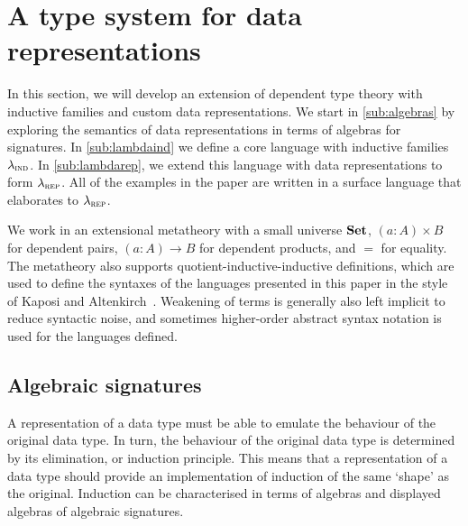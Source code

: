 \section{A type system for data representations}\label{sec:type-system}


In this section, we will develop an extension of dependent type theory with
inductive families and custom data representations. We start in
\cref{sub:algebras} by exploring the semantics of data representations in terms
of algebras for signatures. In \cref{sub:lambdaind}
we define a core language with inductive families $\lambda_{\textsc{ind}}$. In
\cref{sub:lambdarep}, we extend this language with data representations to form
$\lambda_{\textsc{rep}}$. All of the examples in the paper are written in a surface language
that elaborates to $\lambda_{\textsc{rep}}$.

We work in an extensional metatheory with a small universe $\mathbf{Set}$, $(a : A)
\times B$ for dependent pairs, $(a : A) \to B$ for dependent products, and $=$
for equality. The metatheory also supports quotient-inductive-inductive
definitions, which are used to define the syntaxes of the languages presented in
this paper in the style of Kaposi and Altenkirch~\cite{Altenkirch2016-zc}.
Weakening of terms is generally also left implicit to reduce syntactic noise,
and sometimes higher-order abstract syntax notation is used for the
languages defined.

\newcommand{\ValidCase}{\mta{ValidCase}}

\subsection{Algebraic signatures}

A representation of a data type must be able to emulate the behaviour of the
original data type. In turn, the behaviour of the original data type is
determined by its elimination, or induction principle. This means that a
representation of a data type should provide an implementation of induction of
the same `shape' as the original. Induction can be characterised in terms of
algebras and displayed algebras of algebraic signatures.

